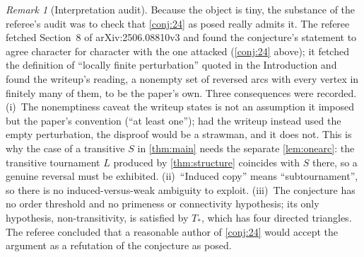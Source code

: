 \documentclass[11pt,a4paper]{article}
\theoremstyle{plain}
\theoremstyle{definition}
\theoremstyle{remark}
\newtheorem{remark}[theorem]{Remark}
\newcommand{\Tstar}{T_{\ast}}
\begin{document}
\begin{remark}[Interpretation audit]\label{rem:interp}
Because the object is tiny, the substance of the referee's audit was to check that \cref{conj:24} as posed really admits it. The referee fetched Section~8 of arXiv:2506.08810v3 and found the conjecture's statement to agree character for character with the one attacked (\cref{conj:24} above); it fetched the definition of ``locally finite perturbation'' quoted in the Introduction and found the writeup's reading, a nonempty set of reversed arcs with every vertex in finitely many of them, to be the paper's own. Three consequences were recorded. (i)~The nonemptiness caveat the writeup states is not an assumption it imposed but the paper's convention (``at least one''); had the writeup instead used the empty perturbation, the disproof would be a strawman, and it does not. This is why the case of a transitive $S$ in \cref{thm:main} needs the separate \cref{lem:onearc}: the transitive tournament $L$ produced by \cref{thm:structure} coincides with $S$ there, so a genuine reversal must be exhibited. (ii)~``Induced copy'' means ``subtournament'', so there is no induced-versus-weak ambiguity to exploit. (iii)~The conjecture has no order threshold and no primeness or connectivity hypothesis; its only hypothesis, non-transitivity, is satisfied by $\Tstar$, which has four directed triangles. The referee concluded that a reasonable author of \cref{conj:24} would accept the argument as a refutation of the conjecture as posed.
\end{remark}
\end{document}
